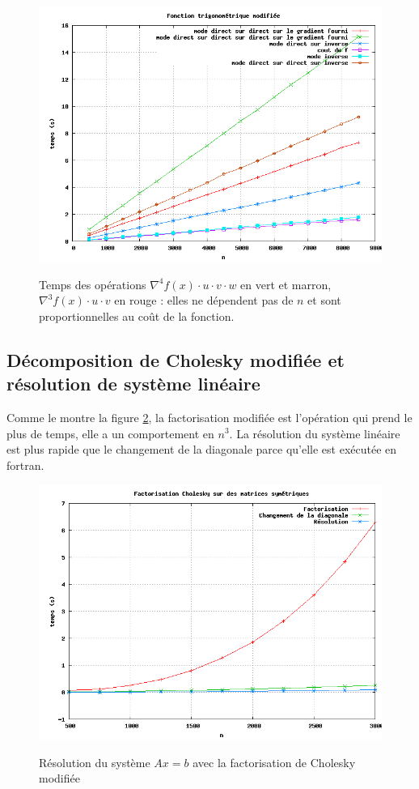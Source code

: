 \begin{figure}
\caption{Temps des op\'erations  $\nabla^4f(x)\cdot u \cdot v \cdot w$ en vert et marron, $\nabla^3 f(x)\cdot u \cdot v$ en rouge : elles ne d\'ependent pas de $n$
et sont proportionnelles au coût de la fonction.}
\center
\includegraphics[scale=0.4]{figures/temps17.png}
\label{fig:temps17}
\end{figure}





\subsection{D\'ecomposition de Cholesky modifi\'ee et r\'esolution de syst\`eme lin\'eaire}


Comme le montre la figure \ref{fig:temps8}, la factorisation modifi\'ee est l'op\'eration qui prend le plus de temps,
elle a un comportement en $n^3$. La r\'esolution du syst\`eme lin\'eaire est plus rapide que le changement de la 
diagonale parce qu'elle est ex\'ecut\'ee en fortran.
\begin{figure}
\caption{R\'esolution du syst\`eme $Ax=b$ avec la factorisation de Cholesky modifi\'ee}
\center
\includegraphics[scale=0.4]{figures/temps8.png}
\label{fig:temps8}
\end{figure}


